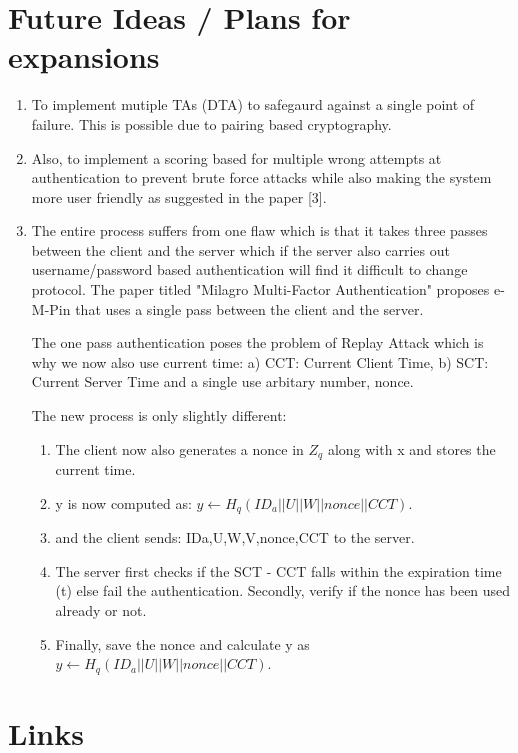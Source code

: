 \documentclass[]{article}   %
\begin{document}
\section*{Future Ideas / Plans for expansions}
\begin{enumerate}
    \item To implement mutiple TAs (DTA) to safegaurd against a single  point of failure. This is possible due to pairing based cryptography.
    \item Also, to implement a scoring based for multiple wrong attempts at authentication to prevent brute force attacks while also making the system more user friendly as suggested in the paper [3]. 
    \item The entire process suffers from one flaw which is that it takes three passes between the client and the server which if the server also carries out username/password based authentication will find it difficult to change protocol. The paper titled "Milagro Multi-Factor Authentication" proposes e-M-Pin that uses a single pass between the client and the server.

    The one pass authentication poses the problem of Replay Attack which is why we now also use current time: a) CCT: Current Client Time, b) SCT: Current Server Time and a single use arbitary number, nonce.
    
    The new process is only slightly different:
    \begin{enumerate}
        \item The client now also generates a nonce in $Z_q$ along with x and stores the current time.
        \item y is now computed as: $y \leftarrow H_q (ID_a || U || W || nonce || CCT).$
        \item and the client sends: {IDa,U,W,V,nonce,CCT} to the server.
        \item The server first checks if the SCT - CCT falls within the expiration time (t) else fail the authentication. Secondly, verify if the nonce has been used already or not.
        \item Finally, save the nonce and calculate y as \newline $y \leftarrow H_q (ID_a || U || W || nonce || CCT).$
    \end{enumerate}
    
\end{enumerate}

\section*{Links}
\end{document}
